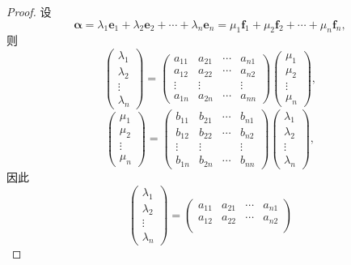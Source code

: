 \documentclass[12pt, a4paper,newtx]{ctexart}
\begin{document}
\begin{proof}
	设
	\[
	\bm\alpha = \lambda_1 \bm e_1 + \lambda_2 \bm e_2 + \cdots + \lambda_n \bm e_n = \mu_1 \bm f_1 + \mu_2 \bm f_2 + \cdots + \mu_n \bm f_n,
	\]
	则
	\[
	\begin{pmatrix}
		\lambda_1 \\
		\lambda_2 \\
		\vdots \\
		\lambda_n
	\end{pmatrix}
	=
	\begin{pmatrix}
		a_{11} & a_{21} & \cdots & a_{n1} \\
		a_{12} & a_{22} & \cdots & a_{n2} \\
		\vdots & \vdots & & \vdots \\
		a_{1n} & a_{2n} & \cdots & a_{nn}
	\end{pmatrix}
	\begin{pmatrix}
		\mu_1 \\
		\mu_2 \\
		\vdots \\
		\mu_n
	\end{pmatrix},
	\]
	\[
	\begin{pmatrix}
		\mu_1 \\
		\mu_2 \\
		\vdots \\
		\mu_n
	\end{pmatrix}
	=
	\begin{pmatrix}
		b_{11} & b_{21} & \cdots & b_{n1} \\
		b_{12} & b_{22} & \cdots & b_{n2} \\
		\vdots & \vdots & & \vdots \\
		b_{1n} & b_{2n} & \cdots & b_{nn}
	\end{pmatrix}
	\begin{pmatrix}
		\lambda_1 \\
		\lambda_2 \\
		\vdots \\
		\lambda_n
	\end{pmatrix},
	\]
	因此
	\[
	\begin{pmatrix}
		\lambda_1 \\
		\lambda_2 \\
		\vdots \\
		\lambda_n
	\end{pmatrix}
	=
	\begin{pmatrix}
		a_{11} & a_{21} & \cdots & a_{n1} \\
		a_{12} & a_{22} & \cdots & a_{n2} \\

\end{pmatrix}\]
\end{proof}
\end{document}
